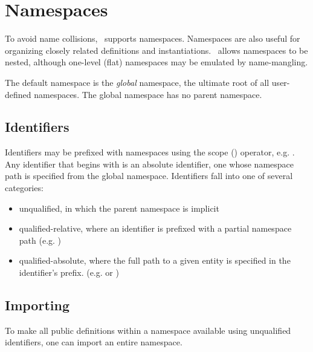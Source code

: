 
\chapter{Namespaces}
\label{sec:namespaces}

To avoid name collisions, \artxx\ supports namespaces.  
Namespaces are also useful for organizing closely related definitions
and instantiations.  
\artxx\ allows namespaces to be nested, although one-level (flat)
namespaces may be emulated by name-mangling.  

The default namespace is the \emph{global} namespace, 
the ultimate root of all user-defined namespaces.  
The global namespace has no parent namespace.  


\section{Identifiers}
\label{sec:namespaces:identifiers}

Identifiers may be prefixed with namespaces using the 
scope (\ttt{::}) operator, e.g. .  
Any identifier that begins with \ttt{::} is an absolute identifier, 
one whose namespace path is specified from the global namespace.  
Identifiers fall into one of several categories:

\begin{itemize}
\item unqualified, in which the parent namespace is implicit
\item qualified-relative, where an identifier is prefixed with a
	partial namespace path (e.g. )
\item qualified-absolute, where the full path to a given entity is 
	specified in the identifier's prefix.  
	(e.g.  or )
\end{itemize}


\section{Importing}
\label{sec:namespaces:import}

To make all public definitions within a namespace available
using unqualified identifiers, one can import an entire namespace.  

